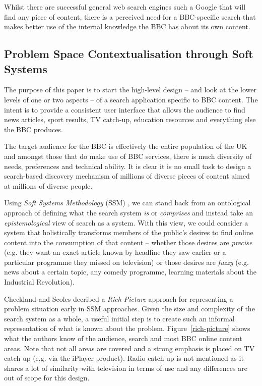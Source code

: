 \documentclass{llncs}
\begin{document}
Whilst there are successful general web search engines such a Google that
will find any piece of content, there is a perceived need for a
BBC-specific search that makes better use of the internal knowledge the BBC
has about its own content.

\subsection{Problem Space Contextualisation through Soft Systems}

The purpose of this paper is to start the high-level design -- and
look at the lower levels of one or two aspects -- of a search application
specific to BBC content. The intent is to provide a consistent user interface
that allows the audience to find news articles, sport results,
TV catch-up, education resources and everything else the BBC produces.

The target audience for the BBC is effectively the entire population of the UK
and amongst those that do make use of BBC services, there is much diversity
of needs, preferences and technical ability. It is clear it is no small
task to design a search-based discovery mechanism of millions of diverse
pieces of content aimed at millions of diverse people.

Using \emph{Soft Systems Methodology} (SSM)
\cite{checkland2006learning}, we can stand back from
an ontological approach of defining what the search system \emph{is} or
\emph{comprises} and instead take an \emph{epistemological} view of search
as a system. With this view, we could consider a system that holistically
transforms members of the public's desires to find online content into
the consumption of that content -- whether those desires are \emph{precise}
(e.g. they want an exact article known by headline they saw earlier or a
particular programme they missed on television) or those desires are
\emph{fuzzy} (e.g. news about a certain topic, any comedy programme, learning
materials about the Industrial Revolution).

Checkland and Scoles\cite{checkland1990soft} decribed a \emph{Rich Picture} approach
for representing a problem situation early in SSM approaches.
Given the size and complexity of the
search system as a whole, a useful initial step is to create such an informal
representation of what is known about the problem. Figure~\ref{rich-picture}
shows what the authors know of the audience, search and most BBC online content areas.
Note that not all areas are covered and a strong emphasis is placed on TV
catch-up (e.g. via the iPlayer product). Radio catch-up is not mentioned
as it shares a lot of similarity with television in terms of use and any
differences are out of scope for this design.
\end{document}
